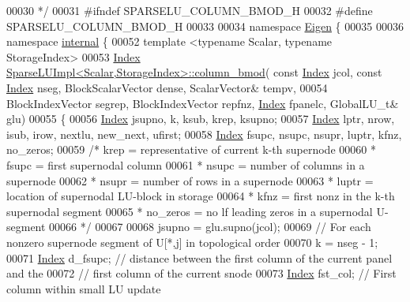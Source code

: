\begin{DoxyCode}
00030 \textcolor{comment}{ */}
00031 \textcolor{preprocessor}{#ifndef SPARSELU\_COLUMN\_BMOD\_H}
00032 \textcolor{preprocessor}{#define SPARSELU\_COLUMN\_BMOD\_H}
00033 
00034 \textcolor{keyword}{namespace }\hyperlink{namespace_eigen}{Eigen} \{
00035 
00036 \textcolor{keyword}{namespace }\hyperlink{namespaceinternal}{internal} \{
00052 \textcolor{keyword}{template} <\textcolor{keyword}{typename} Scalar, \textcolor{keyword}{typename} StorageIndex>
00053 \hyperlink{namespace_eigen_a62e77e0933482dafde8fe197d9a2cfde}{Index} \hyperlink{group___sparse_l_u___module_ae34275602cf12560edfcaf7cd5cbe932}{SparseLUImpl<Scalar,StorageIndex>::column\_bmod}(\textcolor{keyword}{
      const} \hyperlink{namespace_eigen_a62e77e0933482dafde8fe197d9a2cfde}{Index} jcol, \textcolor{keyword}{const} \hyperlink{namespace_eigen_a62e77e0933482dafde8fe197d9a2cfde}{Index} nseg, BlockScalarVector dense, ScalarVector& tempv,
00054                                                      BlockIndexVector segrep, BlockIndexVector repfnz, 
      \hyperlink{namespace_eigen_a62e77e0933482dafde8fe197d9a2cfde}{Index} fpanelc, GlobalLU\_t& glu)
00055 \{
00056   \hyperlink{namespace_eigen_a62e77e0933482dafde8fe197d9a2cfde}{Index}  jsupno, k, ksub, krep, ksupno; 
00057   \hyperlink{namespace_eigen_a62e77e0933482dafde8fe197d9a2cfde}{Index} lptr, nrow, isub, irow, nextlu, new\_next, ufirst; 
00058   \hyperlink{namespace_eigen_a62e77e0933482dafde8fe197d9a2cfde}{Index} fsupc, nsupc, nsupr, luptr, kfnz, no\_zeros; 
00059   \textcolor{comment}{/* krep = representative of current k-th supernode}
00060 \textcolor{comment}{    * fsupc =  first supernodal column}
00061 \textcolor{comment}{    * nsupc = number of columns in a supernode}
00062 \textcolor{comment}{    * nsupr = number of rows in a supernode}
00063 \textcolor{comment}{    * luptr = location of supernodal LU-block in storage}
00064 \textcolor{comment}{    * kfnz = first nonz in the k-th supernodal segment}
00065 \textcolor{comment}{    * no\_zeros = no lf leading zeros in a supernodal U-segment}
00066 \textcolor{comment}{    */}
00067   
00068   jsupno = glu.supno(jcol);
00069   \textcolor{comment}{// For each nonzero supernode segment of U[*,j] in topological order }
00070   k = nseg - 1; 
00071   \hyperlink{namespace_eigen_a62e77e0933482dafde8fe197d9a2cfde}{Index} d\_fsupc; \textcolor{comment}{// distance between the first column of the current panel and the }
00072                \textcolor{comment}{// first column of the current snode}
00073   \hyperlink{namespace_eigen_a62e77e0933482dafde8fe197d9a2cfde}{Index} fst\_col; \textcolor{comment}{// First column within small LU update}

\end{DoxyCode}

